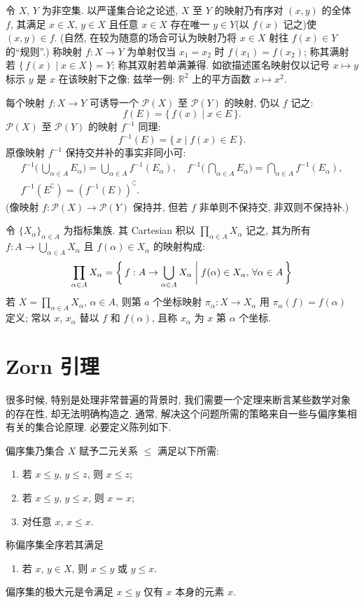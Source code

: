令 $X$, $Y$ 为非空集. 以严谨集合论之论述, $X$ 至 $Y$ 的映射乃有序对 $(x,y)$ 的全体 $f$, 其满足 $x\in X$, $y\in X$ 且任意 $x\in X$ 存在唯一 $y\in Y$(以 $f(x)$ 记之)使 $(x,y)\in f$. (自然, 在较为随意的场合可认为映射乃将 $x\in X$ 射往 $f(x)\in Y$ 的``规则''.) 称映射 $f:X\to Y$ 为单射仅当 $x_1=x_2$ 时 $f(x_1)=f(x_2)$; 称其满射若 $\{\,f(x)\mid x\in X\,\}=Y$; 称其双射若单满兼得. 如欲描述匿名映射仅以记号 $x\mapsto y$ 标示 $y$ 是 $x$ 在该映射下之像; 兹举一例: $\mathbb R^2$ 上的平方函数 $x\mapsto x^2$.

每个映射 $f:X\to Y$ 可诱导一个 $\mathcal P(X)$ 至 $\mathcal P(Y)$ 的映射, 仍以 $f$ 记之:
\[f(E)=\{\,f(x)\mid x\in E\,\}.\]
$\mathcal P(X)$ 至 $\mathcal P(Y)$ 的映射 $f^{-1} $ 同理:
\[f^{-1} (E) = \{\,x\mid f(x)\in E\,\}.\]
原像映射 $f^{-1} $ 保持交并补的事实非同小可:
\begin{gather*}
    f^{-1} \biggl(\, \bigcup_{\alpha\in A}E_\alpha \biggr)  = \bigcup_{\alpha\in A}f^{-1} (E_\alpha),\quad
    f^{-1} \biggl(\, \bigcap_{\alpha\in A}E_\alpha \biggr)  = \bigcap_{\alpha\in A}f^{-1} (E_\alpha), \\
    f^{-1} (E^\complement)                               = \left( f^{-1} (E) \right)^\complement.
\end{gather*}
(像映射 $f:\mathcal P(X)\to \mathcal P(Y)$ 保持并, 但若 $f$ 非单则不保持交, 非双则不保持补.)

令 $\{X_\alpha\}_{\alpha\in A}$ 为指标集族. 其 Cartesian 积以 $\prod_{\alpha\in A}X_\alpha$ 记之, 其为所有 $f:A\to \bigcup _{\alpha\in A}X_\alpha$ 且 $f(\alpha)\in X_\alpha$ 的映射构成:
\[\prod_{\alpha\in A}X_\alpha =\biggl\{ \,f:A\to \bigcup _{\alpha\in A}X_\alpha\biggm| f(\alpha)\in X_\alpha,\,\forall \alpha\in A\, \biggr\} \]
若 $X=\prod_{\alpha\in A}X_\alpha$, $\alpha\in A$, 则第 $a$ 个坐标映射 $\pi _\alpha:X\to X_\alpha$ 用 $\pi _\alpha(f)=f(\alpha)$ 定义; 常以 $x$, $x_\alpha$ 替以 $f$ 和 $f(\alpha)$, 且称 $x_\alpha$ 为 $x$ 第 $\alpha$ 个坐标.
\section{Zorn 引理}
很多时候, 特别是处理非常普遍的背景时, 我们需要一个定理来断言某些数学对象的存在性, 却无法明确构造之. 通常, 解决这个问题所需的策略来自一些与偏序集相有关的集合论原理. 必要定义陈列如下.

偏序集乃集合 $X$ 赋予二元关系 $\leqslant $ 满足以下所需:
\begin{enumerate}
    \item 若 $x\leqslant y$, $y\leqslant z$, 则 $x\leqslant z$;
    \item 若 $x\leqslant y$, $y\leqslant x$, 则 $x= x$;
    \item 对任意 $x$, $x\leqslant x$.
\end{enumerate}
称偏序集全序若其满足
\begin{enumerate}[resume]
    \item 若 $x$, $y\in X$, 则 $x\leqslant y$ 或 $y\leqslant x$.
\end{enumerate}
偏序集的极大元是令满足 $x\leqslant y$ 仅有 $x$ 本身的元素 $x$.

